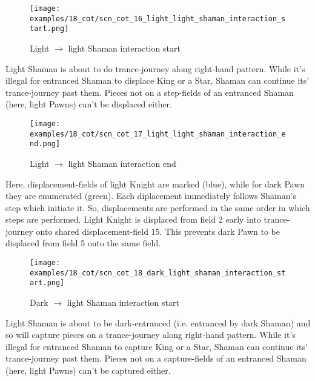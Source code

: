 \noindent
\begin{figure}[!h]
\texttt{[image: examples/18\_cot/scn\_cot\_16\_light\_light\_shaman\_interaction\_start.png]}
\caption{Light $\rightarrow$ light Shaman interaction start}
\label{fig:scn_cot_16_light_light_shaman_interaction_start}
\end{figure}

Light Shaman is about to do trance-journey along right-hand pattern. While it's illegal
for entranced Shaman to displace King or a Star, Shaman can continue its' trance-journey
past them. Pieces not on a step-fields of an entranced Shaman (here, light Pawns) can't
be displaced either.

\clearpage %

\noindent
\begin{figure}[!h]
\texttt{[image: examples/18\_cot/scn\_cot\_17\_light\_light\_shaman\_interaction\_end.png]}
\caption{Light $\rightarrow$ light Shaman interaction end}
\label{fig:scn_cot_17_light_light_shaman_interaction_end}
\end{figure}

Here, displacement-fields of light Knight are marked (blue), while for dark Pawn they
are enumerated (green). Each diplacement immediately follows Shaman's step which initiate
it. So, displacements are performed in the same order in which steps are performed. Light
Knight is displaced from field 2 early into trance-journey onto shared displacement-field
15. This prevents dark Pawn to be displaced from field 5 onto the same field.

\clearpage %

\noindent
\begin{figure}[!h]
\texttt{[image: examples/18\_cot/scn\_cot\_18\_dark\_light\_shaman\_interaction\_start.png]}
\caption{Dark $\rightarrow$ light Shaman interaction start}
\label{fig:scn_cot_18_dark_light_shaman_interaction_start}
\end{figure}

Light Shaman is about to be dark-entranced (i.e. entranced by dark Shaman) and so will capture
pieces on a trance-journey along right-hand pattern. While it's illegal for entranced Shaman
to capture King or a Star, Shaman can continue its' trance-journey past them. Pieces not on
a capture-fields of an entranced Shaman (here, light Pawns) can't be captured either.

